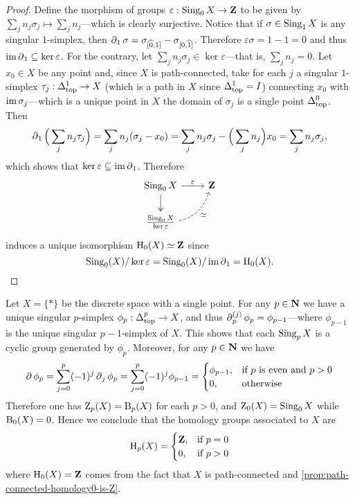 \begin{proof}
Define the morphism of groups \(\varepsilon: \operatorname{Sing}_0 X \to \mathbf{Z}\) to be given by
\(\sum_j n_j \sigma_j \mapsto \sum_j n_j\)---which is clearly surjective. Notice
that if \(\sigma \in \operatorname{Sing}_1 X\) is any singular \(1\)-simplex, then
\(\operatorname{\partial}_1 \sigma = \sigma_{[\widehat 0, 1]} - \sigma_{[0, \widehat
  1]}\). Therefore \(\varepsilon \sigma = 1 - 1 = 0\) and thus
\(\operatorname{im} \operatorname{\partial}_1 \subseteq \ker \varepsilon\). For the contrary, let
\(\sum_j n_j \sigma_j \in \ker \varepsilon\)---that is, \(\sum_j n_j = 0\). Let
\(x_0 \in X\) be any point and, since \(X\) is path-connected, take for each
\(j\) a singular \(1\)-simplex \(\tau_j: \Delta_{\text{top}}^1 \to X\) (which is a path in
\(X\) since \(\Delta_{\text{top}}^1 = I\)) connecting \(x_0\) with \(\operatorname{im} \sigma_j\)---which
is a unique point in \(X\) the domain of \(\sigma_j\) is a single point
\(\Delta_{\text{top}}^0\). Then
\[
\operatorname{\partial}_1 \Big( \sum_j n_j \tau_j \Big) = \sum_j n_j (\sigma_j - x_0)
= \sum_j n_j \sigma_j - \Big(\sum_j n_j\Big) x_0
= \sum_j n_j \sigma_j,
\]
which shows that \(\ker \varepsilon \subseteq \operatorname{im} \operatorname{\partial}_1\). Therefore
\[
\begin{tikzcd}
\Sing_0 X \ar[r, "\varepsilon"] \ar[d, two heads]
&\Z \\
\frac{\Sing_0 X}{\ker \varepsilon}
\ar[ru, dashed, "\dis"', bend right] &
\end{tikzcd}
\]
induces a unique isomorphism \(\operatorname{H}_0(X) \simeq \mathbf{Z}\) since
\[
\operatorname{Sing}_0(X)/\ker\varepsilon = \operatorname{Sing}_0(X)/\operatorname{im} \operatorname{\partial}_1 = \operatorname{H}_0(X).
\]
\end{proof}

\begin{example}
\label{exp:homology-of-point-space}
Let \(X = \{*\}\) be the discrete space with a single point. For any \(p \in
\mathbf{N}\) we have a unique singular \(p\)-simplex \(\phi_p: \Delta_{\text{top}}^p \to X\), and
thus \(\operatorname{\partial}_p^{(j)} \phi_p = \phi_{p-1}\)---where \(\phi_{p-1}\) is the unique
singular \(p-1\)-simplex of \(X\). This shows that each \(\operatorname{Sing}_p X\) is a
cyclic group generated by \(\phi_p\). Moreover, for any \(p \in \mathbf{N}\) we have
\[
\operatorname{\partial} \phi_p = \sum_{j=0}^p (-1)^j \operatorname{\partial}_j \phi_p
= \sum_{j=0}^p (-1)^j \phi_{p-1}
=
\begin{cases}
  \phi_{p-1}, &\text{if } p \text{ is even and } p > 0 \\
  0, &\text{otherwise}
\end{cases}
\]
Therefore one has \(\operatorname{Z}_p(X) = \operatorname{B}_p(X)\) for each \(p > 0\), and
\(\operatorname{Z}_0(X) = \operatorname{Sing}_0 X\) while \(\operatorname{B}_0(X) = 0\). Hence we conclude that the
homology groups associated to \(X\) are
\[
\operatorname{H}_p(X) =
\begin{cases}
  \mathbf{Z}, &\text{if } p = 0 \\
  0, &\text{if } p > 0
\end{cases}
\]
where \(\operatorname{H}_0(X) = \mathbf{Z}\) comes from the fact that \(X\) is path-connected and
\cref{prop:path-connected-homology0-is-Z}.
\end{example}

